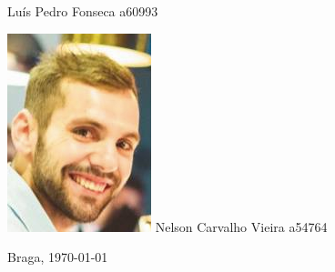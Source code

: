 \begin{titlepage}
\begin{center}
\begin{minipage}[b]{.2\textwidth}
	\small{Luís Pedro Fonseca a60993}
\end{minipage}
\hfill
\begin{minipage}[b]{.2\textwidth}
	\includegraphics[scale=0.63]{nelson}
	\small{Nelson Carvalho Vieira a54764}
\end{minipage}




\vspace{3ex}


\vfill

\large Braga, {\large \today}

\end{center}
\end{titlepage}
